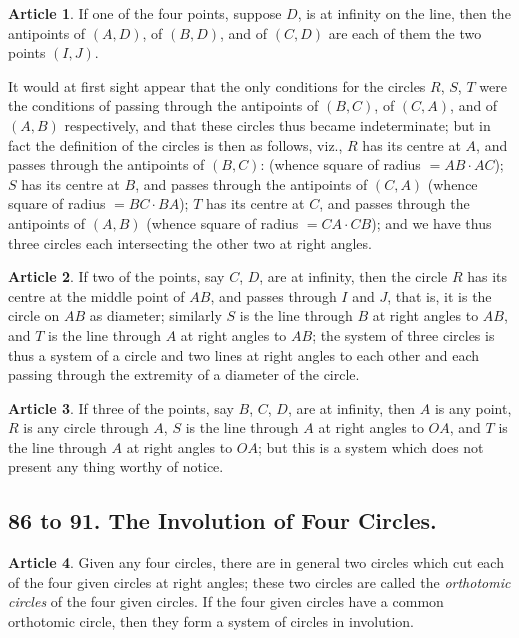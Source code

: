 \documentclass[11pt,a4paper]{article}
\theoremstyle{definition}
\newtheorem{art}{Article}
\begin{document}
\begin{art}
If one of the four points, suppose $D$, is at infinity on the line, then the antipoints of $(A, D)$, of $(B, D)$, and of $(C, D)$ are each of them the two points $(I, J)$.

It would at first sight appear that the only conditions for the circles $R$, $S$, $T$ were the conditions of passing through the antipoints of $(B, C)$, of $(C, A)$, and of $(A, B)$ respectively, and that these circles thus became indeterminate; but in fact the definition of the circles is then as follows, viz., $R$ has its centre at $A$, and passes through the antipoints of $(B, C)$: (whence square of radius $= AB \cdot AC$); $S$ has its centre at $B$, and passes through the antipoints of $(C, A)$ (whence square of radius $= BC \cdot BA$); $T$ has its centre at $C$, and passes through the antipoints of $(A, B)$ (whence square of radius $= CA \cdot CB$); and we have thus three circles each intersecting the other two at right angles.
\end{art}

\begin{art}
If two of the points, say $C$, $D$, are at infinity, then the circle $R$ has its centre at the middle point of $AB$, and passes through $I$ and $J$, that is, it is the circle on $AB$ as diameter; similarly $S$ is the line through $B$ at right angles to $AB$, and $T$ is the line through $A$ at right angles to $AB$; the system of three circles is thus a system of a circle and two lines at right angles to each other and each passing through the extremity of a diameter of the circle.
\end{art}

\begin{art}
If three of the points, say $B$, $C$, $D$, are at infinity, then $A$ is any point, $R$ is any circle through $A$, $S$ is the line through $A$ at right angles to $OA$, and $T$ is the line through $A$ at right angles to $OA$; but this is a system which does not present any thing worthy of notice.
\end{art}

\subsection{86 to 91. The Involution of Four Circles.}

\begin{art}
Given any four circles, there are in general two circles which cut each of the four given circles at right angles; these two circles are called the \textit{orthotomic circles} of the four given circles. If the four given circles have a common orthotomic circle, then they form a system of circles in involution.
\end{art}
\end{document}
